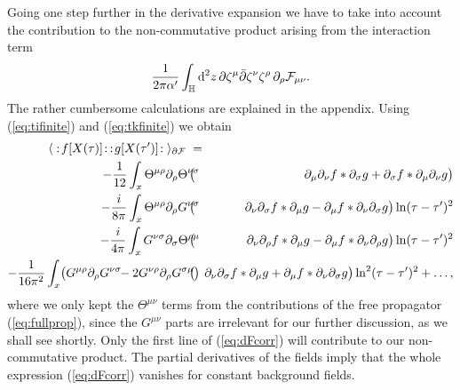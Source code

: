\documentclass[a4paper,12pt]{article}
\let\bra=\langle        \let\ket=\rangle
\newcommand {\ud} {\mathrm{d}}
\newcommand {\cF} {{\cal F}}
\newcommand {\bbH}{\mathbb{H}}
\newcommand {\Back}{\!\!\!\!\!}
\begin{document}
Going one step further in the derivative expansion we have to take into 
account the contribution to the non-commutative product arising from the 
interaction term
\begin{eqnarray}
  \label{eq:derFterm}
  \frac 1{2\pi\alpha'} \int _\bbH \ud^2z \,
         \partial \zeta^\mu \bar\partial \zeta^\nu \zeta^\rho \,
         \partial_\rho \cF_{\mu\nu} .
\end{eqnarray}
The rather cumbersome calculations are explained in the appendix.
Using (\ref{eq:tifinite}) and (\ref{eq:tkfinite}) we obtain
\begin{eqnarray}
  \label{eq:dFcorr}
  \bra\;:\!f[X(\tau)]\!: \, :\!g[X(\tau')]\!:\;\ket_{\partial \cF}
      \; &=& \nonumber \\
  - \frac 1{12} \int _x 
              \Theta^{\mu\rho}\partial_\rho \Theta^{\nu\sigma} 
              \Back &\bigl(& \Back
                    \partial_\mu \partial_\nu f * \partial_\sigma g +
                    \partial_\sigma f * \partial_\mu \partial_\nu g
              \bigr) \\
  - \frac i{8\pi} \int _x 
              \Theta^{\mu\rho}\partial_\rho G^{\nu\sigma} 
              \Back &\bigl(& \Back
                    \partial_\nu \partial_\sigma f * \partial_\mu g -
                    \partial_\mu f * \partial_\nu \partial_\sigma g
              \bigr) \ln (\tau-\tau')^2 \nonumber \\
  - \frac i{4\pi} \int _x 
              G^{\nu\sigma}\partial_\sigma \Theta^{\rho\mu}
              \Back &\bigl(& \Back
                    \partial_\nu \partial_\rho f * \partial_\mu g -
                    \partial_\mu f * \partial_\nu \partial_\rho g
              \bigr) \ln (\tau-\tau')^2 \nonumber \\
  - \frac 1{16\pi^2} \int _x 
                \bigl(G^{\mu\rho}\partial_\rho G^{\nu\sigma} \!\!-
                      2G^{\nu\rho}\partial_\rho G^{\sigma\mu}
                \bigl)
              \Back &\bigl(& \Back
                    \partial_\nu \partial_\sigma f * \partial_\mu g +
                    \partial_\mu f * \partial_\nu \partial_\sigma g
              \bigr) \ln^2(\tau-\tau')^2 +\ldots, \nonumber
\end{eqnarray}
where we only
kept the $\Theta^{\mu\nu}$ terms from the contributions of the free 
propagator (\ref{eq:fullprop}), since the $G^{\mu\nu}$ parts are
irrelevant for our further discussion, as we shall see shortly.
Only the first line of (\ref{eq:dFcorr}) will contribute to our 
non-commutative product. The partial derivatives of the fields imply that
the whole expression (\ref{eq:dFcorr}) vanishes for constant background fields.
\end{document}
